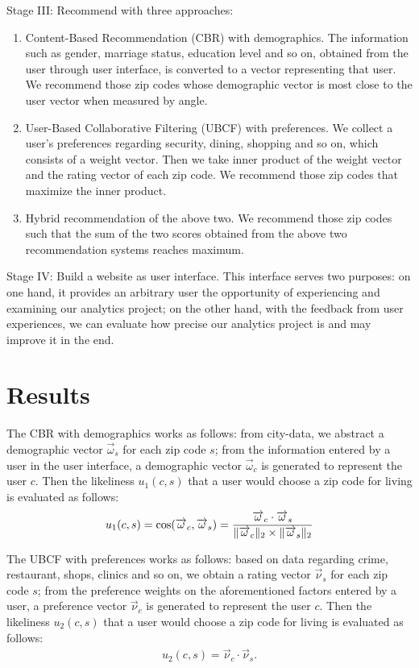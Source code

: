 \documentclass[letterpaper,twocolumn,10pt]{article}
\DeclarePairedDelimiter{\norm}{\lVert}{\rVert}
\begin{document}
Stage III: Recommend with three approaches: 
\begin{enumerate}
\item Content-Based Recommendation (CBR) with demographics. The information  such as gender, marriage status, education level and so on,  obtained from the user through user interface, is converted to  a vector representing that user. We recommend those zip codes  whose demographic vector is most close to the user vector when measured by angle. 
\item User-Based Collaborative Filtering (UBCF) with preferences. We collect a user's preferences regarding security, dining, shopping and so on, which consists of a weight vector. Then we  take inner product of the weight vector and the rating vector of each zip code. We recommend those zip codes that maximize the inner product. 
\item Hybrid recommendation of the above two. We recommend those zip codes such that the sum of the two scores obtained from the above two recommendation systems reaches maximum.
\end{enumerate}

Stage IV: Build a website as user interface. This interface serves two purposes: on one hand, it   provides an  arbitrary user the opportunity of experiencing and examining our analytics project; on the other hand, with the feedback from user experiences, we can evaluate how precise our analytics project is and may improve it in the end.

\section{Results}
The CBR with demographics works as follows: from city-data, we abstract a demographic vector  $ \overrightarrow{\omega}_s$ for each zip code $s$; from the  information entered by a user in the user interface, a demographic vector $\overrightarrow{\omega}_c$ is generated to represent the user $c$. Then the likeliness $u_1(c, s) $ that a user would choose a zip code for living is evaluated as follows:
\begin{align}
 u_1(c, s) = \cos(\overrightarrow{\omega}_c, \overrightarrow{\omega}_s) = \frac{\overrightarrow{\omega}_c\cdot \overrightarrow{\omega}_s}{\norm{\overrightarrow{\omega}_c}_2\times \norm{\overrightarrow{\omega}_s}_2}
 \end{align}
  
 
 
 The  UBCF with preferences works as follows: based on data regarding crime, restaurant, shops, clinics and so on, we obtain a rating vector $ \overrightarrow{\nu}_s$  for each zip code $s$;   from the preference weights on the aforementioned factors  entered by a user, a preference vector  $\overrightarrow{\nu}_c$ is generated to represent the user $c$. Then the likeliness $u_2(c, s) $ that a user would choose a zip code for living is evaluated as follows:
\begin{align}
 u_2(c, s) =  \overrightarrow{\nu}_c\cdot \overrightarrow{\nu}_s.
 \end{align} 
 
\end{document}
